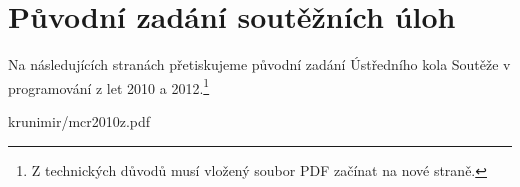 \appendix

\chapter{Původní zadání soutěžních úloh}

Na následujících stranách přetiskujeme původní zadání Ústředního kola Soutěže v
programování z let 2010 a 2012.\footnote{Z technických důvodů musí vložený
soubor PDF začínat na nové straně.}


\newpage 

\label{pdf:krunimir}
 {krunimir/mcr2010z.pdf}

\label{pdf:banshee}

